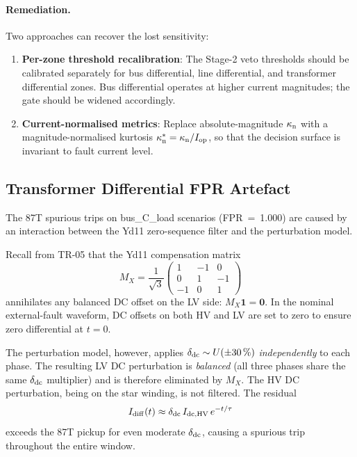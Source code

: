 \documentclass[12pt,a4paper]{article}
\newcommand{\kappan}{\kappa_{\rm n}}
\newcommand{\Iop}{I_{\rm op}}
\begin{document}
\paragraph{Remediation.}
Two approaches can recover the lost sensitivity:
\begin{enumerate}
  \item \textbf{Per-zone threshold recalibration}: The Stage-2 veto
    thresholds should be calibrated separately for bus differential,
    line differential, and transformer differential zones.  Bus
    differential operates at higher current magnitudes; the gate should
    be widened accordingly.
  \item \textbf{Current-normalised metrics}: Replace absolute-magnitude
    $\kappan$ with a magnitude-normalised kurtosis
    $\kappan^* = \kappan / \Iop$, so that the decision surface is
    invariant to fault current level.
\end{enumerate}

\subsection{Transformer Differential FPR Artefact}
\label{sec:disc:tr_fpr}

The 87T spurious trips on bus\_C\_load scenarios (FPR~=~1.000) are
caused by an interaction between the Yd11 zero-sequence filter and the
perturbation model.

Recall from TR-05 that the Yd11 compensation matrix
\begin{equation}
  M_X = \frac{1}{\sqrt{3}}
  \begin{pmatrix} 1 & -1 & 0 \\ 0 & 1 & -1 \\ -1 & 0 & 1 \end{pmatrix}
\end{equation}
annihilates any balanced DC offset on the LV side:
$M_X \mathbf{1} = \mathbf{0}$.  In the nominal external-fault waveform,
DC offsets on both HV and LV are set to zero to ensure zero differential
at $t = 0$.

The perturbation model, however, applies
$\delta_{\rm dc} \sim U(\pm 30\,\%)$ \emph{independently} to each
phase.  The resulting LV DC perturbation is \emph{balanced} (all three
phases share the same $\delta_{\rm dc}$ multiplier) and is therefore
eliminated by $M_X$.  The HV DC perturbation, being on the star winding,
is not filtered.  The residual
\[
  I_{\rm diff}(t) \approx \delta_{\rm dc}\,I_{\rm dc,HV}\,e^{-t/\tau}
\]
exceeds the 87T pickup for even moderate $\delta_{\rm dc}$, causing a
spurious trip throughout the entire window.
\end{document}
